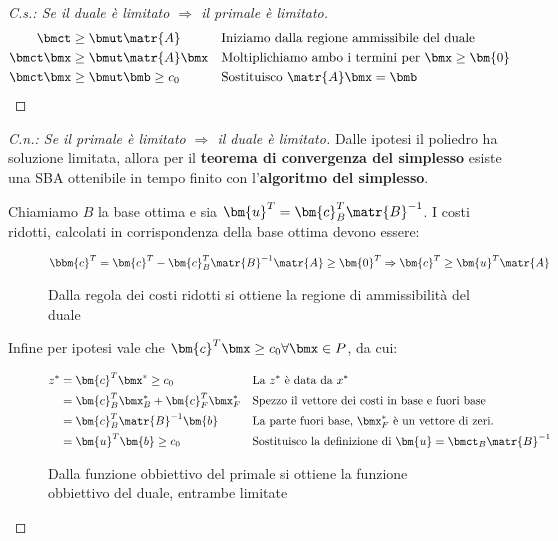 \documentclass[\main/main.tex]{subfiles}
\begin{document}
\begin{proof}[C.s.: Se il duale è limitato $\Rightarrow$ il primale è limitato]
  \begin{align*}
    \bmct     & \geq \bmut \matr{A}      &  & \text{Iniziamo dalla regione ammissibile del duale}         \\
    \bmct\bmx & \geq \bmut \matr{A}\bmx  &  & \text{Moltiplichiamo ambo i termini per $\bmx \geq \bm{0}$} \\
    \bmct\bmx & \geq \bmut \bmb \geq c_0 &  & \text{Sostituisco $\matr{A}\bmx = \bmb$}
  \end{align*}
\end{proof}
\begin{proof}[C.n.: Se il primale è limitato $\Rightarrow$ il duale è limitato]

  Dalle ipotesi il poliedro ha soluzione limitata, allora per il \textbf{teorema di convergenza del simplesso} esiste una SBA ottenibile in tempo finito con l'\textbf{algoritmo del simplesso}.

  Chiamiamo $B$ la base ottima e sia $\bm{u}^T = \bm{c}^T_B \matr{B}^{-1}$. I costi ridotti, calcolati in corrispondenza della base ottima devono essere:

  \begin{figure}
    \[
      \bbm{c}^T = \bm{c}^T - \bm{c}_B^T\matr{B}^{-1}\matr{A} \geq \bm{0}^T \Rightarrow \bm{c}^T \geq \bm{u}^T\matr{A}
    \]
    \caption{Dalla regola dei costi ridotti si ottiene la regione di ammissibilità del duale}
  \end{figure}

  Infine per ipotesi vale che $\bm{c}^T \bmx \geq c_0 \forall \bmx \in P$, da cui:

  \begin{figure}
    \begin{align*}
      z^* & = \bm{c}^T\bmx^* \geq c_0                   &  & \text{La $z^*$ è data da $x^*$}                                       \\
          & = \bm{c}_B^T \bmx^*_B + \bm{c}_F^T \bmx^*_F &  & \text{Spezzo il vettore dei costi in base e fuori base}               \\
          & = \bm{c}_B^T\matr{B}^{-1}\bm{b}             &  & \text{La parte fuori base, $\bmx^*_F$ è un vettore di zeri.}          \\
          & = \bm{u}^T\bm{b}  \geq c_0                  &  & \text{Sostituisco la definizione di $\bm{u} = \bmct_B \matr{B}^{-1}$}
    \end{align*}
    \caption{Dalla funzione obbiettivo del primale si ottiene la funzione obbiettivo del duale, entrambe limitate}
  \end{figure}

\end{proof}
\end{document}
